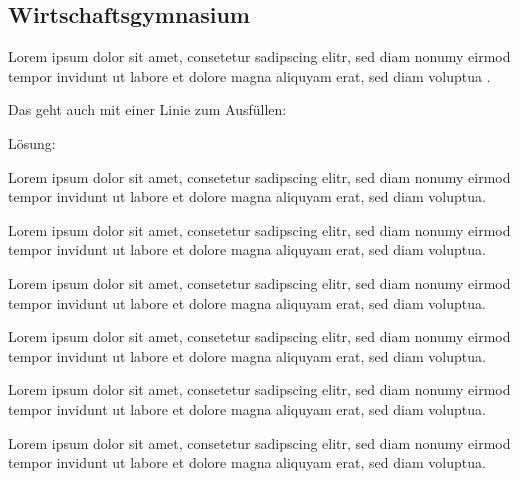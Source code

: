 \documentclass[
shownotess=true,
showresults=false,
edumath,
]{edu}
\begin{document}
\newpage

\subsection{Wirtschaftsgymnasium}


\label{testlabel}

Lorem ipsum dolor sit amet, consetetur sadipscing elitr, sed diam nonumy eirmod tempor invidunt ut labore et dolore magna aliquyam erat, sed diam voluptua .


Das geht auch mit einer Linie zum Ausfüllen:

Lösung:

\begin{definition}[Monotonie]
	Lorem ipsum dolor sit amet, consetetur sadipscing elitr, sed diam nonumy eirmod tempor invidunt ut labore et dolore magna aliquyam erat, sed diam voluptua.
\end{definition}

	Lorem ipsum dolor sit amet, consetetur sadipscing elitr, sed diam nonumy eirmod tempor invidunt ut labore et dolore magna aliquyam erat, sed diam voluptua.

\begin{example}
	Lorem ipsum dolor sit amet, consetetur sadipscing elitr, sed diam nonumy eirmod tempor invidunt ut labore et dolore magna aliquyam erat, sed diam voluptua.
\end{example}

\begin{examplef}
	Lorem ipsum dolor sit amet, consetetur sadipscing elitr, sed diam nonumy eirmod tempor invidunt ut labore et dolore magna aliquyam erat, sed diam voluptua.
\end{examplef}

\begin{exampleexe}
	Lorem ipsum dolor sit amet, consetetur sadipscing elitr, sed diam nonumy eirmod tempor invidunt ut labore et dolore magna aliquyam erat, sed diam voluptua.
\end{exampleexe}

\begin{exampleexef}
	Lorem ipsum dolor sit amet, consetetur sadipscing elitr, sed diam nonumy eirmod tempor invidunt ut labore et dolore magna aliquyam erat, sed diam voluptua.
\end{exampleexef}
\end{document}
